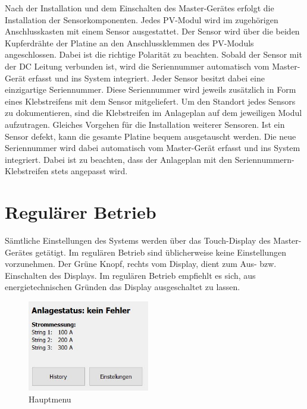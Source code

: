 Nach der  Installation und dem  Einschalten des Master-Ger\"ates   erfolgt die
Installation  der Sensorkomponenten. Jedes  PV-Modul  wird im    zugeh\"origen
Anschlusskasten  mit einem  Sensor  ausgestattet. Der Sensor  wird \"uber  die
beiden  Kupferdr\"ahte  der  Platine  an den  Anschlussklemmen  des  PV-Moduls
angeschlossen. Dabei  ist die  richtige  Polarit\"at  zu beachten. Sobald  der
Sensor mit der DC Leitung verbunden ist, wird die Seriennummer automatisch vom
Master-Ger\"at erfasst  und ins System integriert. Jeder  Sensor besitzt dabei
eine einzigartige  Seriennummer. Diese Seriennummer wird  jeweils zus\"atzlich
in  Form eines  Klebstreifens  mit dem  Sensor  mitgeliefert. Um den  Standort
jedes  Sensors  zu dokumentieren,  sind  die  Klebstreifen im  Anlageplan  auf
dem  jeweiligen Modul  aufzutragen. Gleiches Vorgehen  f\"ur die  Installation
weiterer Sensoren.   Ist ein  Sensor defekt, kann  die gesamte  Platine bequem
ausgetauscht  werden. Die   neue  Seriennummer  wird  dabei   automatisch  vom
Master-Ger\"at erfasst und ins System  integriert. Dabei ist zu beachten, dass
der Anlageplan mit den Seriennummern-Klebstreifen stets angepasst wird.


\section{Regul\"arer Betrieb}
\label{sec:userguide:regular}

\enlargethispage{2em}
S\"amtliche  Einstellungen des  Systems  werden \"uber  das Touch-Display  des
Master-Ger\"ates get\"atigt. Im regul\"aren Betrieb sind \"ublicherweise keine
Einstellungen vorzunehmen. Der  Gr\"une Knopf,  rechts vom Display,  dient zum
Aus- bzw. Einschalten des Displays. Im  regul\"aren Betrieb empfiehlt es sich,
aus energietechnischen Gr\"unden das Display ausgeschaltet zu lassen.

\begin{figure}
    \includegraphics[width=0.475\textwidth]{images/userguide/screen0.png}
    \caption{Hauptmenu}
    \label{fig:userguide:screen0}
\end{figure}

